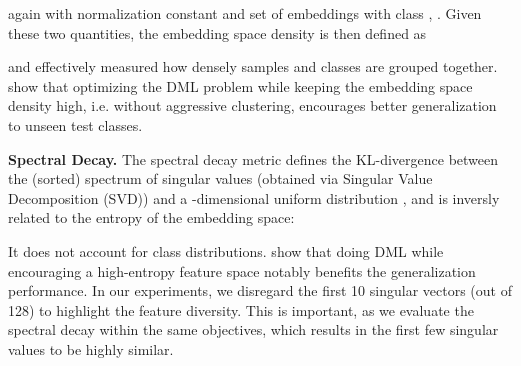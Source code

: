 \documentclass{article} \usepackage{arxiv_style,times}
\begin{document}
again with normalization constant  and set of embeddings with class , . Given these two quantities, the embedding space density is then defined as 

and effectively measured how densely samples and classes are grouped together. \cite{roth2020revisiting} show that optimizing the DML problem while keeping the embedding space density high, i.e. without aggressive clustering, encourages better generalization to unseen test classes.

\textbf{Spectral Decay.}
The spectral decay metric  defines the KL-divergence between the (sorted) spectrum of  singular values  (obtained via Singular Value Decomposition (SVD)) and a -dimensional uniform distribution , and is inversly related to the entropy of the embedding space:

It does not account for class distributions. \cite{roth2020revisiting} show that doing DML while encouraging a high-entropy feature space notably benefits the generalization performance. In our experiments, we disregard the first 10 singular vectors (out of 128) to
highlight the feature diversity. This is important, as we evaluate the spectral decay within the same objectives, which results in the first few singular values to be highly similar.


\newpage
\end{document}
